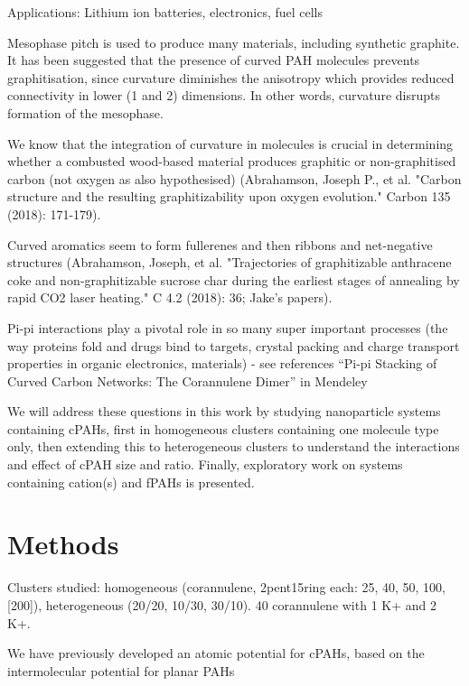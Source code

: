 Applications: Lithium ion batteries, electronics, fuel cells

Mesophase pitch is used to produce many materials, including synthetic graphite.
It has been suggested that the presence of curved PAH molecules prevents graphitisation, since curvature diminishes the anisotropy which provides reduced connectivity in lower (1 and 2) dimensions. In other words, curvature disrupts formation of the mesophase.

We know that the integration of curvature in molecules is crucial in determining whether a combusted wood-based material produces graphitic or non-graphitised carbon (not oxygen as also hypothesised) (Abrahamson, Joseph P., et al. "Carbon structure and the resulting graphitizability upon oxygen evolution." Carbon 135 (2018): 171-179).

Curved aromatics seem to form fullerenes and then ribbons and net-negative structures (Abrahamson, Joseph, et al. "Trajectories of graphitizable anthracene coke and non-graphitizable sucrose char during the earliest stages of annealing by rapid CO2 laser heating." C 4.2 (2018): 36; Jake's papers).



Pi-pi interactions play a pivotal role in so many super important processes (the way proteins fold and drugs bind to targets, crystal packing and charge transport properties in organic electronics, materials) - see references “Pi-pi Stacking of Curved Carbon Networks: The Corannulene Dimer” in Mendeley


We will address these questions in this work by studying nanoparticle systems containing cPAHs, first in homogeneous clusters containing one molecule type only, then extending this to heterogeneous clusters to understand the interactions and effect of cPAH size and ratio. Finally, exploratory work on systems containing cation(s) and fPAHs is presented.




\section{Methods}
Clusters studied: homogeneous (corannulene, 2pent15ring each: 25, 40, 50, 100, [200]), heterogeneous (20/20, 10/30, 30/10).
40 corannulene with 1 K+ and 2 K+.

We have previously developed an atomic potential for cPAHs, based on the intermolecular potential for planar PAHs 



